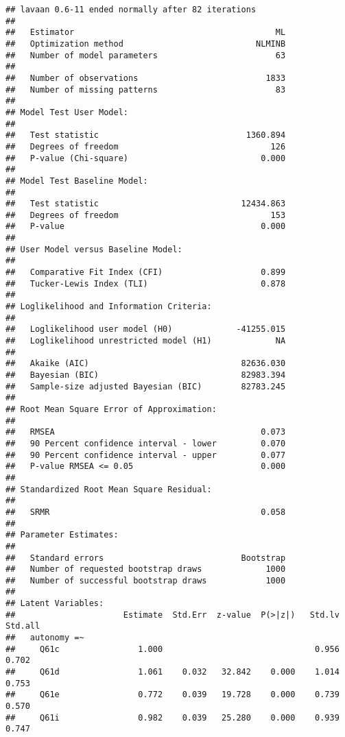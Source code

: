 \documentclass[
]{article}
\begin{document}
\begin{verbatim}
## lavaan 0.6-11 ended normally after 82 iterations
## 
##   Estimator                                         ML
##   Optimization method                           NLMINB
##   Number of model parameters                        63
##                                                       
##   Number of observations                          1833
##   Number of missing patterns                        83
##                                                       
## Model Test User Model:
##                                                       
##   Test statistic                              1360.894
##   Degrees of freedom                               126
##   P-value (Chi-square)                           0.000
## 
## Model Test Baseline Model:
## 
##   Test statistic                             12434.863
##   Degrees of freedom                               153
##   P-value                                        0.000
## 
## User Model versus Baseline Model:
## 
##   Comparative Fit Index (CFI)                    0.899
##   Tucker-Lewis Index (TLI)                       0.878
## 
## Loglikelihood and Information Criteria:
## 
##   Loglikelihood user model (H0)             -41255.015
##   Loglikelihood unrestricted model (H1)             NA
##                                                       
##   Akaike (AIC)                               82636.030
##   Bayesian (BIC)                             82983.394
##   Sample-size adjusted Bayesian (BIC)        82783.245
## 
## Root Mean Square Error of Approximation:
## 
##   RMSEA                                          0.073
##   90 Percent confidence interval - lower         0.070
##   90 Percent confidence interval - upper         0.077
##   P-value RMSEA <= 0.05                          0.000
## 
## Standardized Root Mean Square Residual:
## 
##   SRMR                                           0.058
## 
## Parameter Estimates:
## 
##   Standard errors                            Bootstrap
##   Number of requested bootstrap draws             1000
##   Number of successful bootstrap draws            1000
## 
## Latent Variables:
##                      Estimate  Std.Err  z-value  P(>|z|)   Std.lv  Std.all
##   autonomy =~                                                             
##     Q61c                1.000                               0.956    0.702
##     Q61d                1.061    0.032   32.842    0.000    1.014    0.753
##     Q61e                0.772    0.039   19.728    0.000    0.739    0.570
##     Q61i                0.982    0.039   25.280    0.000    0.939    0.747

\end{verbatim}
\end{document}
